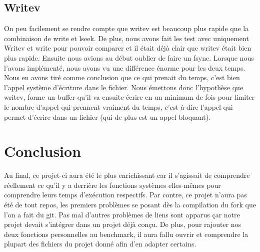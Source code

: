 \documentclass[11pt, oneside]{article}
\begin{document}
\begin{multicols}{2}
\subsection{Writev}
On peu facilement se rendre compte que writev est beaucoup plus rapide que la combinaison de write et lseek. De plus, nous avons fait les test avec uniquement Writev et write pour pouvoir comparer et il était déjà clair que writev était bien plus rapide. Ensuite nous avions au début oublier de faire un fsync. Lorsque nous l'avons implémenté, nous avons vu une différence énorme pour les deux temps. Nous en avons tiré comme conclusion que ce qui prenait du temps, c'est bien l'appel système d'écriture dans le fichier. Nous émettons donc l'hypothèse que writev, forme un buffer qu'il va ensuite écrire en un minimum de fois pour limiter le nombre d'appel qui prennent vraiment du temps, c'est-à-dire l'appel qui permet d'écrire dans un fichier (qui de plus est un appel bloquant).


\section{Conclusion}
Au final, ce projet-ci aura été le plus enrichissant car il s'agissait de comprendre réellement ce qu'il y a derrière les fonctions systèmes elles-mêmes pour comprendre leurs temps d'exécution respectifs. Par contre, ce projet n'aura pas été de tout repos, les premiers problèmes se posant dès la compilation du fork que l'on a fait du git. Pas mal d'autres problèmes de liens sont apparus çar notre projet devait s'intégrer dans un projet déjà conçu. De plus, pour rajouter nos deux fonctions personnelles au benchmark, il aura fallu ouvrir et comprendre la plupart des fichiers du projet donné afin d'en adapter certains. 
\end{multicols}
\end{document}

